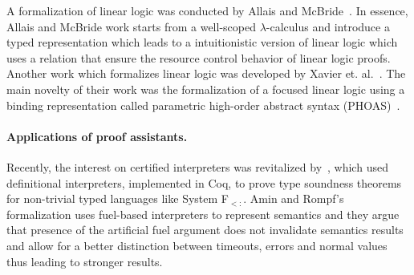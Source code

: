 A formalization of linear logic was conducted by Allais and McBride~\cite{allais18}. In essence, Allais and McBride work
starts from a well-scoped $\lambda$-calculus and introduce a typed representation which leads to a intuitionistic version
of linear logic which uses a relation that ensure the resource control behavior of linear logic proofs. Another work which
formalizes linear logic was developed by Xavier et. al.~\cite{xavier18}. The main novelty of their work was the formalization
of a focused linear logic using a binding representation called parametric high-order abstract syntax (PHOAS)~\cite{Chlipala08}.


\paragraph{Applications of proof assistants.}


Recently, the interest on certified interpreters was revitalized by~\citet{Amin17}, which used definitional
interpreters, implemented in Coq, to prove type soundness theorems for non-trivial typed languages like System F$_{<:}$.
Amin and Rompf's formalization uses fuel-based interpreters to represent semantics and they argue that presence of
the artificial fuel argument does not invalidate semantics results and allow for a better distinction between timeouts,
errors and normal values thus leading to stronger results.


